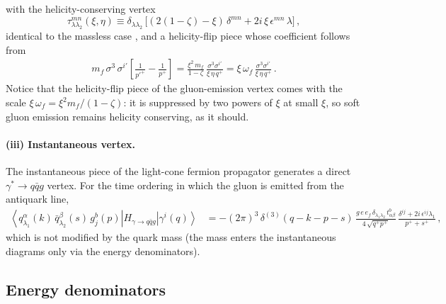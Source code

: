 \documentclass[11pt,a4paper]{article}
\newcommand{\ket}[1]{\left|#1\right\rangle}
\newcommand{\bra}[1]{\left\langle#1\right|}
\numberwithin{equation}{section}
\begin{document}
with the helicity-conserving vertex
\begin{equation}
\label{eq:taudef}
\tau^{mn}_{\lambda \lambda_{2}}(\xi,\eta) \equiv \delta_{\lambda \lambda_{2}}\,
\big[(2(1-\zeta)-\xi)\,\delta^{mn}+2i\,\xi\,\epsilon^{mn}\,\lambda\big]\,,
\end{equation}
identical to the massless case \cite{Iancu:2022gpw}, and a helicity-flip piece whose
coefficient follows from
\begin{align}
m_{f}\,\sigma^{3}\,\sigma^{i'}\left[\frac{1}{p'^{+}}-\frac{1}{p^{+}}\right] =
\frac{\xi^{2}\,m_{f}}{1-\zeta}\,\frac{\sigma^{3}\sigma^{i'}}{\xi\,\eta\,q^{+}}
= \xi\,\omega_f\,\frac{\sigma^{3}\sigma^{i'}}{\xi\,\eta\,q^{+}}\,.
\end{align}
Notice that the helicity-flip piece of the gluon-emission vertex comes with the scale
$\xi\,\omega_f=\xi^2 m_f/(1-\zeta)$: it is suppressed by two powers of $\xi$ at small $\xi$, so
soft gluon emission remains helicity conserving, as it should.

\paragraph{(iii) Instantaneous vertex.} The instantaneous piece of the light-cone fermion
propagator generates a direct $\gamma^*\to q\bar q g$ vertex. For the time ordering in which
the gluon is emitted from the antiquark line,
\begin{align}
\label{eq:Hinst}
\bra{q^{\alpha}_{\lambda_{1}}(k)\,\bar{q}^{\beta}_{\lambda_{2}}(s)\,g^{b}_{j}(p)}
H_{\gamma\rightarrow q\bar{q}g}\ket{\gamma^i(q)} & = -(2\pi)^{3}\, \delta^{(3)}(q-k-p-s)\,
\frac{g\,e\,e_{f}\,\delta_{\lambda_{1}\lambda_{2}}\,t^{b}_{\alpha\beta}}{4\,\sqrt{q^{+}p^{+}}}\,
\frac{\delta^{ij}+2i\,\epsilon^{ij}\lambda_{1}}{p^{+}+s^{+}}\,,
\end{align}
which is not modified by the quark mass (the mass enters the instantaneous diagrams only via
the energy denominators).

\subsection{Energy denominators}
\label{sec:denominators}
\end{document}
